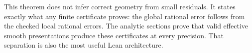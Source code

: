 This theorem does not infer correct geometry from small residuals. It states exactly what any finite certificate proves: the global rational error follows from the checked local rational errors. The analytic sections prove that valid effective smooth presentations produce these certificates at every precision. That separation is also the most useful Lean architecture.
